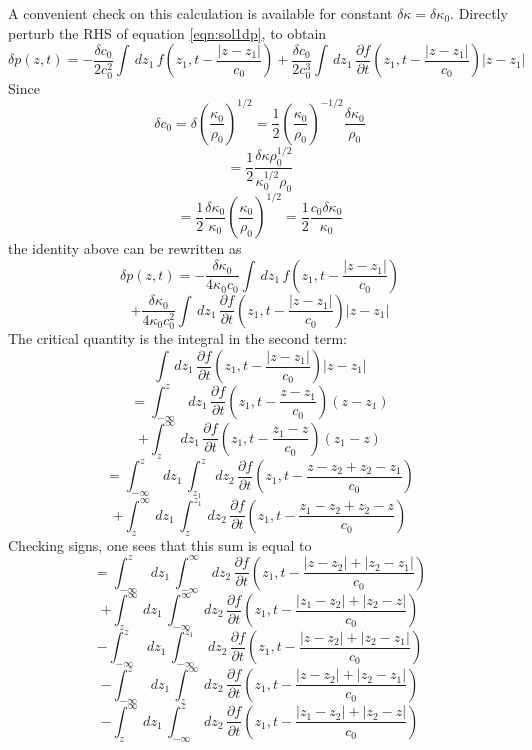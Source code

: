 A convenient check on this calculation is available for constant
$\delta \kappa = \delta \kappa_0$. Directly perturb the RHS of equation 
\ref{eqn:sol1dp}, to obtain
\[
  \delta p(z,t) = -\frac{\delta c_0}{2 c_0^2} \int
  \,dz_1\,f\left(z_1,t-\frac{|z-z_1|}{c_0}\right)
  +\frac{\delta c_0}{2c_0^3}\int
  \,dz_1\,\frac{\partial f}{\partial
    t}\left(z_1,t-\frac{|z-z_1|}{c_0}\right)|z-z_1|
\]
Since
\[
  \delta c_0 = \delta \left(\frac{\kappa_0}{\rho_0}\right)^{1/2} =
  \frac{1}{2} \left(\frac{\kappa_0}{\rho_0}\right)^{-1/2}\frac{\delta
    \kappa_0}{\rho_0}
\]
\[
  = \frac{1}{2}\frac{\delta \kappa \rho_0^{1/2}}{\kappa_0^{1/2}\rho_0}
  \]
\[
=\frac{1}{2} \frac{\delta
  \kappa_0}{\kappa_0}\left(\frac{\kappa_0}{\rho_0}\right)^{1/2}
=\frac{1}{2} \frac{c_0\delta \kappa_0}{\kappa_0}
\]
the identity above can be rewritten as
\[
  \delta p(z,t) = -\frac{\delta \kappa_0}{4 \kappa_0 c_0} \int
  \,dz_1\,f\left(z_1,t-\frac{|z-z_1|}{c_0}\right)
  \]
\begin{equation}
  \label{eqn:dpraw} 
  +\frac{\delta \kappa_0}{4\kappa_0c_0^2}\int
  \,dz_1\,\frac{\partial f}{\partial
    t}\left(z_1,t-\frac{|z-z_1|}{c_0}\right)|z-z_1|
\end{equation}
The critical quantity is the integral in the second term:
\[
  \int \,dz_1\,\frac{\partial f}{\partial t}\left(z_1,t-\frac{|z-z_1|}{c_0}\right)|z-z_1|
\]
\[
  = \int_{-\infty}^z \,dz_1\,\frac{\partial f}{\partial
    t}\left(z_1,t-\frac{z-z_1}{c_0}\right)(z-z_1)
\]
\[
   + \int^{\infty}_z \,dz_1\,\frac{\partial f}{\partial t}\left(z_1,t-\frac{z_1-z}{c_0}\right)(z_1-z)
 \]
 \[
   =\int_{-\infty}^z \,dz_1\,\int_{z_1}^{z} \,dz_2\, \frac{\partial f}{\partial
     t}\left(z_1,t-\frac{z-z_2+z_2-z_1}{c_0}\right)
 \]
 \[
   + \int^{\infty}_z \,dz_1\,\int_{z}^{z_1}\,dz_2\,\frac{\partial
     f}{\partial t}\left(z_1,t-\frac{z_1-z_2 + z_2-z}{c_0}\right)
 \]
 Checking signs, one sees that this sum is equal to
 \[
   =\int_{-\infty}^z \,dz_1\,\int_{-\infty}^{\infty} \,dz_2\, \frac{\partial f}{\partial
     t}\left(z_1,t-\frac{|z-z_2|+|z_2-z_1|}{c_0}\right)
 \]
 \[
   + \int^{\infty}_z \,dz_1\,\int_{-\infty}^{\infty}\,dz_2\,\frac{\partial
     f}{\partial t}\left(z_1,t-\frac{|z_1-z_2| + |z_2-z|}{c_0}\right)
 \]
 \[
   -\int_{-\infty}^z \,dz_1\,\int_{-\infty}^{z_1} \,dz_2\, \frac{\partial f}{\partial
     t}\left(z_1,t-\frac{|z-z_2|+|z_2-z_1|}{c_0}\right)
 \]
\[
   -\int_{-\infty}^z \,dz_1\,\int_{z}^{\infty} \,dz_2\, \frac{\partial f}{\partial
     t}\left(z_1,t-\frac{|z-z_2|+|z_2-z_1|}{c_0}\right)
 \]
 \[
   - \int^{\infty}_z \,dz_1\,\int_{-\infty}^{z}\,dz_2\,\frac{\partial
     f}{\partial t}\left(z_1,t-\frac{|z_1-z_2| + |z_2-z|}{c_0}\right)
 \]
